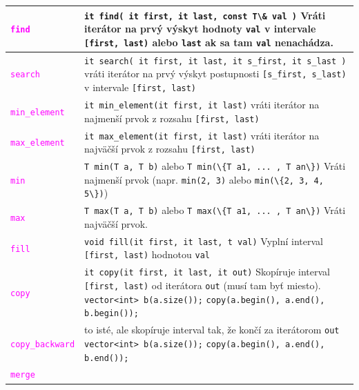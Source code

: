 \documentclass[10pt]{article}
\def\prg{\lstinline}
\def\ods{\vspace*{10pt}}
\begin{document}
\ods
\def\xx#1{\textcolor{magenta}{\prg!#1!}}
\begin{tabularx}{\textwidth}{lX}\toprule
  \xx{find} & \prg!it find( it first, it last, const T\& val )! \newline
              Vráti iterátor na prvý výskyt
              hodnoty \prg!val! v intervale 
              \prg![first, last)! alebo \prg!last! ak sa tam \prg!val! nenachádza.\\\midrule
  \xx{search}&\prg!it search( it first, it last, it s_first, it s_last )! \newline
  vráti iterátor na prvý výskyt 
  postupnosti \prg![s_first, s_last)! v intervale \prg![first, last)!
  \\\midrule
  \xx{min_element}&\prg!it min_element(it first, it last)!\newline
  vráti iterátor na najmenší prvok z rozsahu \prg![first, last)!\\
  \xx{max_element}&\prg!it max_element(it first, it last)!\newline
  vráti iterátor na najväčší prvok z rozsahu \prg![first, last)!\\\midrule
  \xx{min}&\prg!T min(T a, T b)! alebo \prg!T min(\{T a1, ... , T an\})!\newline
  Vráti  najmenší prvok  (napr. \prg!min(2, 3)! alebo \prg!min(\{2, 3, 4, 5\})!)\\
  \xx{max}&\prg!T max(T a, T b)! alebo \prg!T max(\{T a1, ... , T an\})!\newline
  Vráti najväčší prvok.\\\midrule
  \xx{fill}&\prg!void fill(it first, it last, t val)!\newline
  Vyplní interval \prg![first, last)! hodnotou {\tt val}\\\midrule
  \xx{copy}&\prg!it copy(it first, it last, it out)!\newline
  Skopíruje interval \prg![first, last)! od iterátora \prg!out! (musí tam byť miesto).
  \newline
  \prg!vector<int> b(a.size());!\newline
  \prg!copy(a.begin(), a.end(), b.begin());!
  \\
  \xx{copy_backward} & to isté, ale skopíruje interval tak, že končí za iterátorom
  {\tt out}\newline
  \prg!vector<int> b(a.size());!\newline
  \prg!copy(a.begin(), a.end(), b.end());!
  \\\midrule
  \xx{merge}&\prg!it merge(it first1, it last1,

\end{tabularx}
\end{document}
